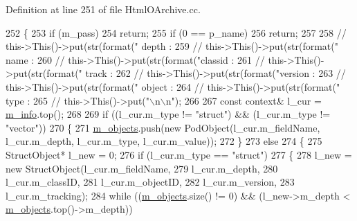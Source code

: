 Definition at line 251 of file Html\-O\-Archive.\-cc.


\begin{DoxyCode}
252 \{
253   \textcolor{keywordflow}{if} (m\_pass)
254     \textcolor{keywordflow}{return};
255   \textcolor{keywordflow}{if} (0 == p\_name)
256     \textcolor{keywordflow}{return};
257 
258   \textcolor{comment}{//     this->This()->put(str(format("  depth : %
259   \textcolor{comment}{//     this->This()->put(str(format("   name : %
260   \textcolor{comment}{//     this->This()->put(str(format("classid : %
261   \textcolor{comment}{//     this->This()->put(str(format("  track : %
262   \textcolor{comment}{//     this->This()->put(str(format("version : %
263   \textcolor{comment}{//     this->This()->put(str(format(" object : %
264   \textcolor{comment}{//     this->This()->put(str(format("   type : %
265   \textcolor{comment}{//     this->This()->put("\(\backslash\)n\(\backslash\)n");}
266 
267   \textcolor{keyword}{const} context& l\_cur = \hyperlink{classxtd_1_1servers_1_1app_1_1HtmlOArchive_a03bd854507f8457a3b5b575203108ff7}{m\_info}.top();
268 
269   \textcolor{keywordflow}{if} ((l\_cur.m\_type != \textcolor{stringliteral}{"struct"}) && (l\_cur.m\_type != \textcolor{stringliteral}{"vector"}))
270   \{
271     \hyperlink{classxtd_1_1servers_1_1app_1_1HtmlOArchive_a69e333ff9b2b0743e14976cfa4afd6d2}{m\_objects}.push(\textcolor{keyword}{new} PodObject(l\_cur.m\_fieldName, l\_cur.m\_depth, l\_cur.m\_type, l\_cur.m\_value));
272   \}
273   \textcolor{keywordflow}{else}
274   \{
275     StructObject* l\_new = 0;
276     \textcolor{keywordflow}{if} (l\_cur.m\_type == \textcolor{stringliteral}{"struct"})
277     \{
278       l\_new = \textcolor{keyword}{new} StructObject(l\_cur.m\_fieldName,
279                                l\_cur.m\_depth,
280                                l\_cur.m\_classID,
281                                l\_cur.m\_objectID,
282                                l\_cur.m\_version,
283                                l\_cur.m\_tracking);
284       \textcolor{keywordflow}{while} ((\hyperlink{classxtd_1_1servers_1_1app_1_1HtmlOArchive_a69e333ff9b2b0743e14976cfa4afd6d2}{m\_objects}.size() != 0) && (l\_new->m\_depth < \hyperlink{classxtd_1_1servers_1_1app_1_1HtmlOArchive_a69e333ff9b2b0743e14976cfa4afd6d2}{m\_objects}.top()->m\_depth))
}}}}}}}
\end{DoxyCode}
